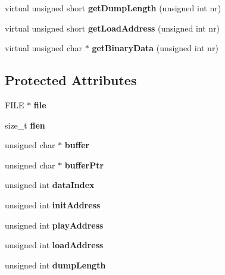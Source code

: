 \begin{DoxyCompactItemize}
\item 
\mbox{\label{class_cbm_tune_a04e386349818c372ab156328f4a0aa85}} 
virtual unsigned short {\bfseries get\+Dump\+Length} (unsigned int nr)
\item 
\mbox{\label{class_cbm_tune_afef4e8540e6e05155e84c7f8e2d4d52e}} 
virtual unsigned short {\bfseries get\+Load\+Address} (unsigned int nr)
\item 
\mbox{\label{class_cbm_tune_a858ce335914dd2abf6513eef59b870bd}} 
virtual unsigned char $\ast$ {\bfseries get\+Binary\+Data} (unsigned int nr)
\end{DoxyCompactItemize}
\subsection*{Protected Attributes}
\begin{DoxyCompactItemize}
\item 
\mbox{\label{class_cbm_tune_a106c13d318860db96d319f36c2598897}} 
F\+I\+LE $\ast$ {\bfseries file}
\item 
\mbox{\label{class_cbm_tune_a735e6e0603b46432b54c777de50d6fb0}} 
size\+\_\+t {\bfseries flen}
\item 
\mbox{\label{class_cbm_tune_a8f9aed86c8d211cfd332c962cb62d0ff}} 
unsigned char $\ast$ {\bfseries buffer}
\item 
\mbox{\label{class_cbm_tune_a73650f62ced08084d9827aff03c63140}} 
unsigned char $\ast$ {\bfseries buffer\+Ptr}
\item 
\mbox{\label{class_cbm_tune_a80be5d3c04d12a659003bb79e93c4ecd}} 
unsigned int {\bfseries data\+Index}
\item 
\mbox{\label{class_cbm_tune_ab0ece74517df48be70c252bc366690cc}} 
unsigned int {\bfseries init\+Address}
\item 
\mbox{\label{class_cbm_tune_af6a90bb2c71ecfd1c6fb342bd886d39d}} 
unsigned int {\bfseries play\+Address}
\item 
\mbox{\label{class_cbm_tune_ae89cd00086af46ad024e38de71f2856a}} 
unsigned int {\bfseries load\+Address}
\item 
\mbox{\label{class_cbm_tune_a98fd7202eb2a9d4c0ea8d9043cb5323b}} 
unsigned int {\bfseries dump\+Length}
\end{DoxyCompactItemize}


